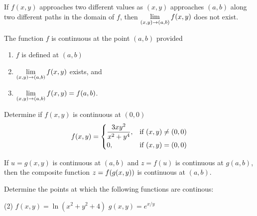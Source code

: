 \documentclass[mathNotesPreamble]{subfiles}
\begin{document}
  \begin{thmBox*}
    If $f(x,y)$ approaches two different values as $(x,y)$ approaches $(a,b)$ along two different paths in the domain of $f$, then $\displaystyle\lim_{(x,y)\to (a,b)} f(x,y)$ does not exist.
  \end{thmBox*}
  \pagebreak

  \begin{defn*}[Continuity]
    The function $f$ is continuous at the point $(a,b)$ provided
    \begin{enumerate}
      \item $f$ is defined at $(a,b)$
      \item $\displaystyle\lim_{(x,y)\to (a,b)} f(x,y)$ exists, and 
      \item $\displaystyle\lim_{(x,y)\to (a,b)} f(x,y) = f(a,b)$.
    \end{enumerate}
  \end{defn*}

  \begin{ex*}
    Determine if $f(x,y)$ is continuous at $(0,0)$
      \[f(x,y)=\begin{cases}
        \displaystyle\frac{3xy^2}{x^2+y^4}, &\textnormal{if } (x,y)\neq (0,0)\\
        0, &\textnormal{if } (x,y)=(0,0)
      \end{cases}\]
  \end{ex*}

  \begin{thmBox*}
    If $u=g(x,y)$ is continuous at $(a,b)$ and $z=f(u)$ is continuous at $g(a,b)$, then the composite function $z=f{\left(g(x,y)\right)}$ is continuous at $(a,b)$.
  \end{thmBox*}

  \begin{ex*}
    Determine the points at which the following functions are continous:
  \end{ex*}
  \begin{tasks}[after-item-skip=\stretch{1}, label=](2)
    \task $f(x,y)=\ln(x^2+y^2+4)$
    \task $g(x,y)=e^{x/y}$
  \end{tasks}
  \pagebreak
\end{document}
